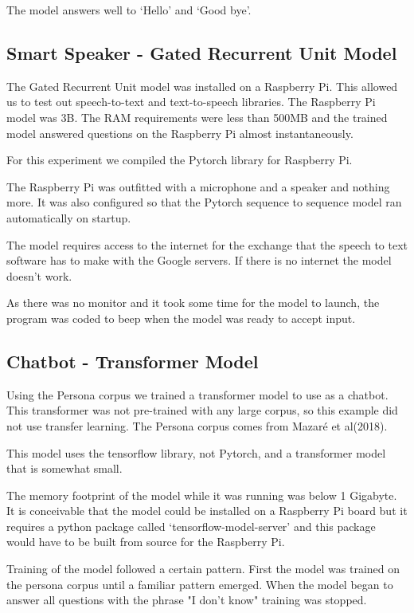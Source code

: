 The model answers well to `Hello' and `Good bye'.

\subsection{Smart Speaker - Gated Recurrent Unit Model}

The Gated Recurrent Unit model was installed on a Raspberry Pi. This allowed us to test out speech-to-text and text-to-speech libraries. The Raspberry Pi model was 3B. The RAM requirements were less than 500MB and the trained model answered questions on the Raspberry Pi almost instantaneously.

For this experiment we compiled the Pytorch library for Raspberry Pi.

The Raspberry Pi was outfitted with a microphone and a speaker and nothing more. It was also configured so that the Pytorch sequence to sequence model ran automatically on startup.

The model requires access to the internet for the exchange that the speech to text software has to make with the Google servers. If there is no internet the model doesn't work.

As there was no monitor and it took some time for the model to launch, the program was coded to beep when the model was ready to accept input.

\subsection{Chatbot - Transformer Model}
Using the Persona corpus we trained a transformer model to use as a chatbot. This transformer was not pre-trained with any large corpus, so this example did not use transfer learning. The Persona corpus comes from Mazar{\'{e}} et al(2018)\cite{DBLP:journals/corr/abs-1809-01984}.

This model uses the tensorflow library, not Pytorch, and a transformer model that is somewhat small.

The memory footprint of the model while it was running was below 1 Gigabyte. It is conceivable that the model could be installed on a Raspberry Pi board but it requires a python package called `tensorflow-model-server' and this package would have to be built from source for the Raspberry Pi. 

Training of the model followed a certain pattern. First the model was trained on the persona corpus until a familiar pattern emerged. When the model began to answer all questions with the 
phrase "I don't know" training was stopped. 

